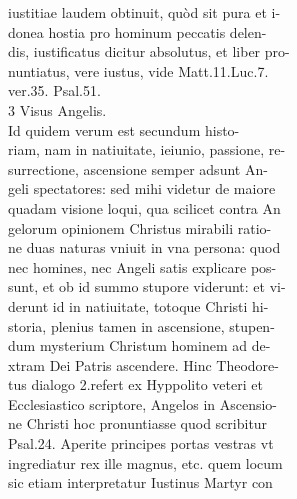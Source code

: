 \documentclass{article}
\begin{document}
\begin{pages}
                iustitiae laudem obtinuit, quòd sit pura et i- \\
                donea hostia pro hominum peccatis delen- \\
                dis, iustificatus dicitur absolutus, et liber pro- \\
                nuntiatus, vere iustus, vide Matt.11.Luc.7. \\
                ver.35. Psal.51. \\
                3 Visus Angelis. \\
                Id quidem verum est secundum histo- \\
                riam, nam in natiuitate, ieiunio, passione, re- \\
                surrectione, ascensione semper adsunt An- \\
                geli spectatores: sed mihi videtur de maiore \\
                quadam visione loqui, qua scilicet contra An \\
                gelorum opinionem Christus mirabili ratio- \\
                ne duas naturas vniuit in vna persona: quod \\
                nec homines, nec Angeli satis explicare pos- \\
                sunt, et ob id summo stupore viderunt: et vi- \\
                derunt id in natiuitate, totoque Christi hi- \\
                storia, plenius tamen in ascensione, stupen- \\
                dum mysterium Christum hominem ad de- \\
                xtram Dei Patris ascendere. Hinc Theodore- \\
                tus dialogo 2.refert ex Hyppolito veteri et \\
                Ecclesiastico scriptore, Angelos in Ascensio- \\
                ne Christi hoc pronuntiasse quod scribitur \\
                Psal.24. Aperite principes portas vestras vt \\
                ingrediatur rex ille magnus, etc. quem locum \\
                sic etiam interpretatur Iustinus Martyr con \\

\end{pages}
\end{document}
